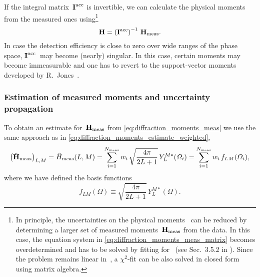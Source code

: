 If the integral matrix~$\bm{\mathrm{I}}^\text{acc}$ is invertible, we can
calculate the physical moments from the measured ones
using\footnote{In principle, the uncertainties on the physical
moments~ can be reduced by determining a larger set of
measured moments~$\bm{\mathrm{H}}_\text{meas}$ from the data.  In this case,
the equation system in \cref{eq:diffraction_moments_meas_matrix}
becomes overdetermined and has to be solved by fitting for~
(see \eg Sec.~3.5.2 in ).  Since the problem
remains linear in~, a $\chi^2$-fit can be also solved in
closed form using matrix algebra.}
\begin{equation}
  \label{eq:diffraction_phys_moments}
  \vect{H}
  = \rBrk[0]{\mat{I}^\text{acc}}^{-1}\, \vect{H}_\text{meas}.
\end{equation}
In case the detection efficiency is close to zero over wide ranges of
the phase space, $\bm{\mathrm{I}}^\text{acc}$~may become (nearly) singular.
In this case, certain moments may become immeasurable and one has to
revert to the support-vector moments developed by
R.~Jones~\cite{Jones:2023}.


\subsubsection{Estimation of measured moments and uncertainty propagation}%
\label{sec:diffraction:estimation_uncert}

To obtain an estimate for~$\bm{\mathrm{H}}_\text{meas}$ from
\cref{eq:diffraction_moments_meas} we use the same approach as in
\cref{eq:diffraction_moments_estimate_weighted}, \ie
\begin{equation}
  \label{eq:diffraction_moments_meas_estimate_weighted}
  \rBrk[1]{\hat{\vect{H}}_\text{meas}}_{L, M}
  = \hat{H}_\text{meas}(L, M)
  = \sum_{i = 1}^{N_\text{meas}} w_i\, \sqrt{\frac{4 \pi}{2 L + 1}}\, Y_L^{M *}(\Omega_i)
  = \sum_{i = 1}^{N_\text{meas}} w_i\, f_{L M}(\Omega_i),
\end{equation}
where we have defined the basis functions
\begin{equation}
  \label{eq:diffraction_basis_fcn}
  f_{L M}(\Omega)
  \equiv \sqrt{\frac{4 \pi}{2 L + 1}}\, Y_L^{M *}(\Omega).
\end{equation}

